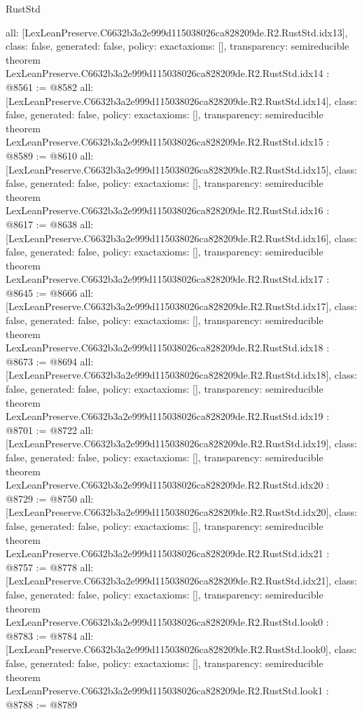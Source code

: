 \begin{lexlean}{RustStd}
\begin{coremodule}
{  all: [LexLeanPreserve.C6632b3a2e999d115038026ca828209de.R2.RustStd.idx13],
  class: false,
  generated: false,
  policy: exact{axioms: []},
  transparency: semireducible
}
theorem LexLeanPreserve.C6632b3a2e999d115038026ca828209de.R2.RustStd.idx14 : @8561 := @8582 {
  all: [LexLeanPreserve.C6632b3a2e999d115038026ca828209de.R2.RustStd.idx14],
  class: false,
  generated: false,
  policy: exact{axioms: []},
  transparency: semireducible
}
theorem LexLeanPreserve.C6632b3a2e999d115038026ca828209de.R2.RustStd.idx15 : @8589 := @8610 {
  all: [LexLeanPreserve.C6632b3a2e999d115038026ca828209de.R2.RustStd.idx15],
  class: false,
  generated: false,
  policy: exact{axioms: []},
  transparency: semireducible
}
theorem LexLeanPreserve.C6632b3a2e999d115038026ca828209de.R2.RustStd.idx16 : @8617 := @8638 {
  all: [LexLeanPreserve.C6632b3a2e999d115038026ca828209de.R2.RustStd.idx16],
  class: false,
  generated: false,
  policy: exact{axioms: []},
  transparency: semireducible
}
theorem LexLeanPreserve.C6632b3a2e999d115038026ca828209de.R2.RustStd.idx17 : @8645 := @8666 {
  all: [LexLeanPreserve.C6632b3a2e999d115038026ca828209de.R2.RustStd.idx17],
  class: false,
  generated: false,
  policy: exact{axioms: []},
  transparency: semireducible
}
theorem LexLeanPreserve.C6632b3a2e999d115038026ca828209de.R2.RustStd.idx18 : @8673 := @8694 {
  all: [LexLeanPreserve.C6632b3a2e999d115038026ca828209de.R2.RustStd.idx18],
  class: false,
  generated: false,
  policy: exact{axioms: []},
  transparency: semireducible
}
theorem LexLeanPreserve.C6632b3a2e999d115038026ca828209de.R2.RustStd.idx19 : @8701 := @8722 {
  all: [LexLeanPreserve.C6632b3a2e999d115038026ca828209de.R2.RustStd.idx19],
  class: false,
  generated: false,
  policy: exact{axioms: []},
  transparency: semireducible
}
theorem LexLeanPreserve.C6632b3a2e999d115038026ca828209de.R2.RustStd.idx20 : @8729 := @8750 {
  all: [LexLeanPreserve.C6632b3a2e999d115038026ca828209de.R2.RustStd.idx20],
  class: false,
  generated: false,
  policy: exact{axioms: []},
  transparency: semireducible
}
theorem LexLeanPreserve.C6632b3a2e999d115038026ca828209de.R2.RustStd.idx21 : @8757 := @8778 {
  all: [LexLeanPreserve.C6632b3a2e999d115038026ca828209de.R2.RustStd.idx21],
  class: false,
  generated: false,
  policy: exact{axioms: []},
  transparency: semireducible
}
theorem LexLeanPreserve.C6632b3a2e999d115038026ca828209de.R2.RustStd.look0 : @8783 := @8784 {
  all: [LexLeanPreserve.C6632b3a2e999d115038026ca828209de.R2.RustStd.look0],
  class: false,
  generated: false,
  policy: exact{axioms: []},
  transparency: semireducible
}
theorem LexLeanPreserve.C6632b3a2e999d115038026ca828209de.R2.RustStd.look1 : @8788 := @8789 {
}
\end{coremodule}
\end{lexlean}

